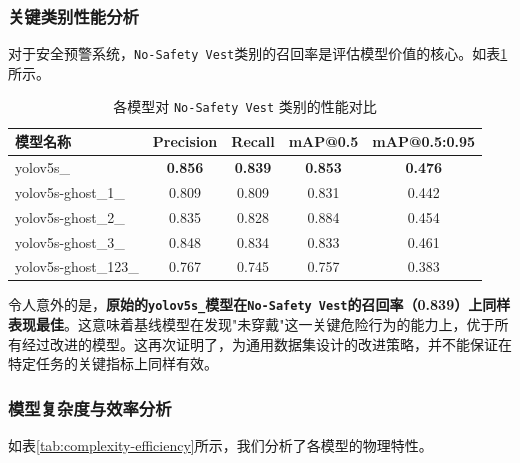 \documentclass[a4paper]{ctexart}
\begin{document}
\subsubsection{关键类别性能分析}
对于安全预警系统，\texttt{No-Safety Vest}类别的召回率是评估模型价值的核心。如表\ref{tab:critical-class-performance}所示。

\begin{table}[H]
    \centering
    \caption{各模型对 \texttt{No-Safety Vest} 类别的性能对比}
    \label{tab:critical-class-performance}
    \begin{tabular}{lcccc}
        \toprule
        \textbf{模型名称} & \textbf{Precision} & \textbf{Recall} & \textbf{mAP@0.5} & \textbf{mAP@0.5:0.95} \\
        \midrule
        yolov5s\_             & \textbf{0.856} & \textbf{0.839} & \textbf{0.853} & \textbf{0.476} \\
        yolov5s-ghost\_1\_    & 0.809          & 0.809          & 0.831          & 0.442          \\
        yolov5s-ghost\_2\_    & 0.835          & 0.828          & 0.884          & 0.454          \\
        yolov5s-ghost\_3\_    & 0.848          & 0.834          & 0.833          & 0.461          \\
        yolov5s-ghost\_123\_  & 0.767          & 0.745          & 0.757          & 0.383          \\
        \bottomrule
    \end{tabular}
\end{table}

令人意外的是，\textbf{原始的\texttt{yolov5s\_}模型在\texttt{No-Safety Vest}的召回率（0.839）上同样表现最佳}。这意味着基线模型在发现"未穿戴"这一关键危险行为的能力上，优于所有经过改进的模型。这再次证明了，为通用数据集设计的改进策略，并不能保证在特定任务的关键指标上同样有效。

\subsubsection{模型复杂度与效率分析}
如表\ref{tab:complexity-efficiency}所示，我们分析了各模型的物理特性。
\end{document}
